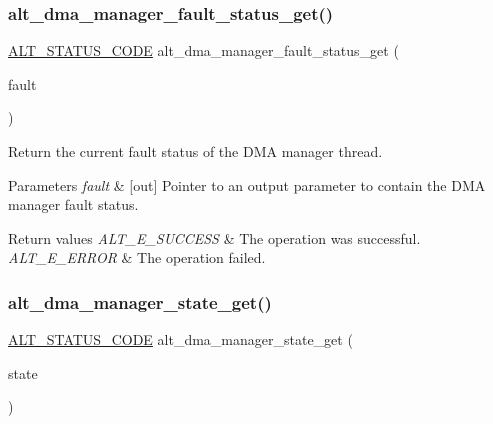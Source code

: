 \subsubsection{\texorpdfstring{alt\_dma\_manager\_fault\_status\_get()}{alt\_dma\_manager\_fault\_status\_get()}}
{\footnotesize\ttfamily \mbox{\hyperlink{hwlib_8h_abdb0d369f069723ca55d6c94bcaaaa12}{A\+L\+T\+\_\+\+S\+T\+A\+T\+U\+S\+\_\+\+C\+O\+DE}} alt\+\_\+dma\+\_\+manager\+\_\+fault\+\_\+status\+\_\+get (\begin{DoxyParamCaption}\item[{\mbox{\hyperlink{group__ALT__DMA__CSR_gaca87b43fe85277c9791fe8f3c4d574a3}{A\+L\+T\+\_\+\+D\+M\+A\+\_\+\+M\+A\+N\+A\+G\+E\+R\+\_\+\+F\+A\+U\+L\+T\+\_\+t}} $\ast$}]{fault }\end{DoxyParamCaption})}

Return the current fault status of the D\+MA manager thread.


\begin{DoxyParams}{Parameters}
{\em fault} & \mbox{[}out\mbox{]} Pointer to an output parameter to contain the D\+MA manager fault status.\\
\hline
\end{DoxyParams}

\begin{DoxyRetVals}{Return values}
{\em A\+L\+T\+\_\+\+E\+\_\+\+S\+U\+C\+C\+E\+SS} & The operation was successful. \\
\hline
{\em A\+L\+T\+\_\+\+E\+\_\+\+E\+R\+R\+OR} & The operation failed. \\
\hline
\end{DoxyRetVals}
\mbox{\label{group__ALT__DMA__CSR_ga8cfb03775804cd8a38746bad720e3df0}} 
\subsubsection{\texorpdfstring{alt\_dma\_manager\_state\_get()}{alt\_dma\_manager\_state\_get()}}
{\footnotesize\ttfamily \mbox{\hyperlink{hwlib_8h_abdb0d369f069723ca55d6c94bcaaaa12}{A\+L\+T\+\_\+\+S\+T\+A\+T\+U\+S\+\_\+\+C\+O\+DE}} alt\+\_\+dma\+\_\+manager\+\_\+state\+\_\+get (\begin{DoxyParamCaption}\item[{\mbox{\hyperlink{group__ALT__DMA__CSR_ga7037ee411489693c9d62b992b99339b7}{A\+L\+T\+\_\+\+D\+M\+A\+\_\+\+M\+A\+N\+A\+G\+E\+R\+\_\+\+S\+T\+A\+T\+E\+\_\+t}} $\ast$}]{state }\end{DoxyParamCaption})}

